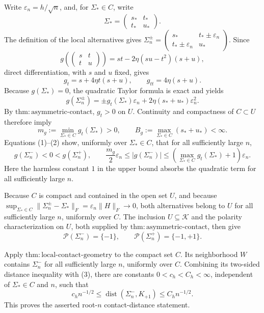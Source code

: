 Write \(\varepsilon_n=h/\sqrt n\), and, for \(\Sigma_*\in C\), write
\[
 \Sigma_*=\begin{pmatrix}s_*&t_*\\t_*&u_*\end{pmatrix}.
\]
The definition of the local alternatives gives
\(\Sigma_n^\pm=\begin{pmatrix}s_*&t_*\pm\varepsilon_n\\t_*\pm\varepsilon_n&u_*\end{pmatrix}\).  Since
\[
 g\!\left(\begin{pmatrix}s&t\\t&u\end{pmatrix}\right)
 =st-2\eta(su-t^2)(s+u),
\]
direct differentiation, with \(s\) and \(u\) fixed, gives
\[
 g_t=s+4\eta t(s+u),\qquad g_{tt}=4\eta(s+u).
\]
Because \(g(\Sigma_*)=0\), the quadratic Taylor formula is exact and yields
\[
 g(\Sigma_n^\pm)
 =\pm g_t(\Sigma_*)\varepsilon_n
   +2\eta(s_*+u_*)\varepsilon_n^2. \tag{1}
\]
By \(\mathrm{thm:asymmetric\text{-}contact}\), \(g_t>0\) on \(U\).  Continuity and compactness of \(C\subset U\) therefore imply
\[
 m_g:=\min_{\Sigma_*\in C}g_t(\Sigma_*)>0,
 \qquad
 B_g:=\max_{\Sigma_*\in C}(s_*+u_*)<\infty. \tag{2}
\]
Equations (1)--(2) show, uniformly over \(\Sigma_*\in C\), that for all sufficiently large \(n\),
\[
 g(\Sigma_n^-)<0<g(\Sigma_n^+),
 \qquad
 \frac{m_g}{2}\varepsilon_n
 \le |g(\Sigma_n^-)|
 \le
 \left(\max_{\Sigma_*\in C}g_t(\Sigma_*)+1\right)\varepsilon_n. \tag{3}
\]
Here the harmless constant \(1\) in the upper bound absorbs the quadratic term for all sufficiently large \(n\).

Because \(C\) is compact and contained in the open set \(U\), and because
\(\sup_{\Sigma_*\in C}\|\Sigma_n^\pm-\Sigma_*\|_F
=\varepsilon_n\|H\|_F\to0\), both alternatives belong to \(U\) for all sufficiently large \(n\), uniformly over \(C\).  The inclusion \(U\subseteq\mathcal K\) and the polarity characterization on \(U\), both supplied by \(\mathrm{thm:asymmetric\text{-}contact}\), then give
\[
 \mathcal P(\Sigma_n^-)=\{-1\},
 \qquad
 \mathcal P(\Sigma_n^+)=\{-1,+1\}. \tag{4}
\]

Apply \(\mathrm{thm:local\text{-}contact\text{-}geometry}\) to the compact set \(C\).  Its neighborhood \(W\) contains \(\Sigma_n^-\) for all sufficiently large \(n\), uniformly over \(C\).  Combining its two-sided distance inequality with (3), there are constants \(0<c_h<C_h<\infty\), independent of \(\Sigma_*\in C\) and \(n\), such that
\[
 c_h n^{-1/2}
 \le \operatorname{dist}(\Sigma_n^-,K_{+1})
 \le C_h n^{-1/2}. \tag{5}
\]
This proves the asserted root-\(n\) contact-distance statement.


